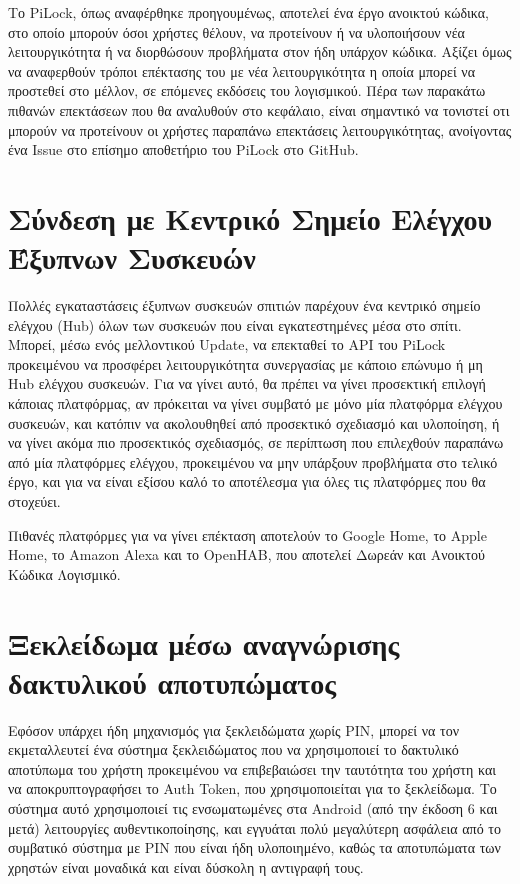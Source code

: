 \label{ch:future_expansion}
Το PiLock, όπως αναφέρθηκε προηγουμένως, αποτελεί ένα έργο ανοικτού κώδικα, στο οποίο μπορούν όσοι χρήστες θέλουν, να προτείνουν ή να υλοποιήσουν νέα λειτουργικότητα ή να διορθώσουν προβλήματα στον ήδη υπάρχον κώδικα. Αξίζει όμως να αναφερθούν τρόποι επέκτασης του με νέα λειτουργικότητα η οποία μπορεί να προστεθεί στο μέλλον, σε επόμενες εκδόσεις του λογισμικού. Πέρα των παρακάτω πιθανών επεκτάσεων που θα αναλυθούν στο κεφάλαιο, είναι σημαντικό να τονιστεί οτι μπορούν να προτείνουν οι χρήστες παραπάνω επεκτάσεις λειτουργικότητας, ανοίγοντας ένα Issue στο επίσημο αποθετήριο του PiLock στο GitHub.  %

\section{Σύνδεση με Κεντρικό Σημείο Ελέγχου Έξυπνων Συσκευών}
	Πολλές εγκαταστάσεις έξυπνων συσκευών σπιτιών παρέχουν ένα κεντρικό σημείο ελέγχου (Hub) όλων των συσκευών που είναι εγκατεστημένες μέσα στο σπίτι. Μπορεί, μέσω ενός μελλοντικού Update, να επεκταθεί το API του PiLock προκειμένου να προσφέρει λειτουργικότητα συνεργασίας με κάποιο επώνυμο ή μη Hub ελέγχου συσκευών. Για να γίνει αυτό, θα πρέπει να γίνει προσεκτική επιλογή κάποιας πλατφόρμας, αν πρόκειται να γίνει συμβατό με μόνο μία πλατφόρμα ελέγχου συσκευών, και κατόπιν να ακολουθηθεί από προσεκτικό σχεδιασμό και υλοποίηση, ή να γίνει ακόμα πιο προσεκτικός σχεδιασμός, σε περίπτωση που επιλεχθούν παραπάνω από μία πλατφόρμες ελέγχου, προκειμένου να μην υπάρξουν προβλήματα στο τελικό έργο, και για να είναι εξίσου καλό το αποτέλεσμα για όλες τις πλατφόρμες που θα στοχεύει.

	Πιθανές πλατφόρμες για να γίνει επέκταση αποτελούν το Google Home, το Apple Home, το Amazon Alexa και το OpenHAB, που αποτελεί Δωρεάν και Ανοικτού Κώδικα Λογισμικό.

\section{Ξεκλείδωμα μέσω αναγνώρισης δακτυλικού αποτυπώματος}
	Εφόσον υπάρχει ήδη μηχανισμός για ξεκλειδώματα χωρίς PIN, μπορεί να τον εκμεταλλευτεί ένα σύστημα ξεκλειδώματος που να χρησιμοποιεί το δακτυλικό αποτύπωμα του χρήστη προκειμένου να επιβεβαιώσει την ταυτότητα του χρήστη και να αποκρυπτογραφήσει το Auth Token, που χρησιμοποιείται για το ξεκλείδωμα. Το σύστημα αυτό χρησιμοποιεί τις ενσωματωμένες στα Android (από την έκδοση 6 και μετά) λειτουργίες αυθεντικοποίησης, και εγγυάται πολύ μεγαλύτερη ασφάλεια από το συμβατικό σύστημα με PIN που είναι ήδη υλοποιημένο, καθώς τα αποτυπώματα των χρηστών είναι μοναδικά και είναι δύσκολη η αντιγραφή τους.

